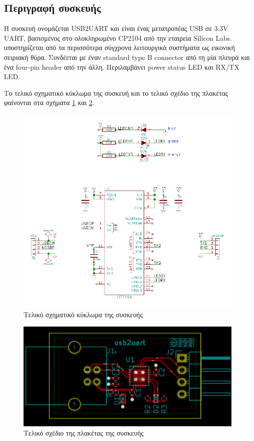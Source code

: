 \documentclass[a4paper]{article}
\begin{document}
\subsection{Περιγραφή συσκευής}
Η συσκευή ονομάζεται USB2UART και είναι ένας μετατροπέας USB σε 3.3V UART, βασισμένος στο ολοκληρωμένο \textenglish{CP2104} από την εταιρεία Silicon Labs. υποστηρίζεται από τα περισσότερα σύγχρονα λειτουργικά συστήματα ως εικονική σειριακή θύρα. Συνδέεται με έναν standard type B connector από τη μία πλευρά και ένα four-pin header από την άλλη. Περιλαμβάνει power status \textenglish{LED} και RX/TX \textenglish{LED}.

Το τελικό σχηματικό κύκλωμα της συσκευή και το τελικό σχέδιο της πλακέτας φαίνονται στα σχήματα \ref{fig:eesch-schem-final} και \ref{fig:pcbn-layout-final}.

\begin{figure}
  \begin{center}
    \includegraphics[width=.9\textwidth]{img/eesch-schem-final.png}
    \caption{Τελικό σχηματικό κύκλωμα της συσκευής}
    \label{fig:eesch-schem-final}
  \end{center}
\end{figure}

\begin{figure}
  \begin{center}
    \includegraphics[width=.9\textwidth]{img/pcbn-layout-final.png}
    \caption{Τελικό σχέδιο της πλακέτας της συσκευής}
    \label{fig:pcbn-layout-final}
  \end{center}
\end{figure}
\end{document}

